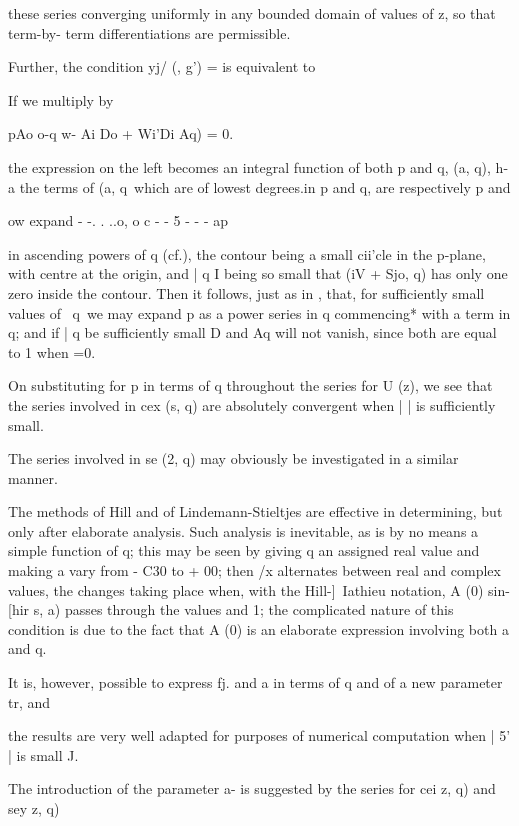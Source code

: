 {{these series converging uniformly in any bounded domain of values of
z, so that term-by- term differentiations are permissible.

Further, the condition yj/ (, g') = is equivalent to

If we multiply by

pAo o-q w- Ai Do + Wi'Di Aq) = 0.

%
%

the expression on the left becomes an integral function of both p and
q, (a, q), h-a\; the terms of (a, q\ which are of lowest degrees.in p
and q, are respectively p and

 ow expand - -. . ..o, o c - - 5 - - - ap

in ascending powers of q (cf.), the contour being a small
cii'cle in the p-plane, with centre at the origin, and | q I being so
small that (iV + Sjo, q) has only one zero inside the contour. Then it
follows, just as in , that, for sufficiently small values of \
q\, we may expand p as a power series in q commencing* with a term in
q; and if | q be sufficiently small D and Aq will not vanish, since
both are equal to 1 when =0.

On substituting for p in terms of q throughout the series for U (z),
we see that the series involved in cex (s, q) are absolutely
convergent when | | is sufficiently small.

The series involved in se (2, q) may obviously be investigated in a
similar manner.


The methods of Hill and of Lindemann-Stieltjes are effective in
determining, but only after elaborate analysis. Such analysis is
inevitable, as is by no means a simple function of q; this may be
seen by giving q an assigned real value and making a vary from - C30
to + 00; then /x alternates between real and complex values, the
changes taking place when, with the Hill-]\ Iathieu notation, A (0)
sin- [hir s, a) passes through the values and 1; the complicated
nature of this condition is due to the fact that A (0) is an elaborate
expression involving both a and q.

It is, however, possible to express fj. and a in terms of q and of a
new parameter tr, and

the results are very well adapted for purposes of numerical
computation when | 5' | is small J.

The introduction of the parameter a- is suggested by the series for
cei z, q) and sey z, q)

}}
